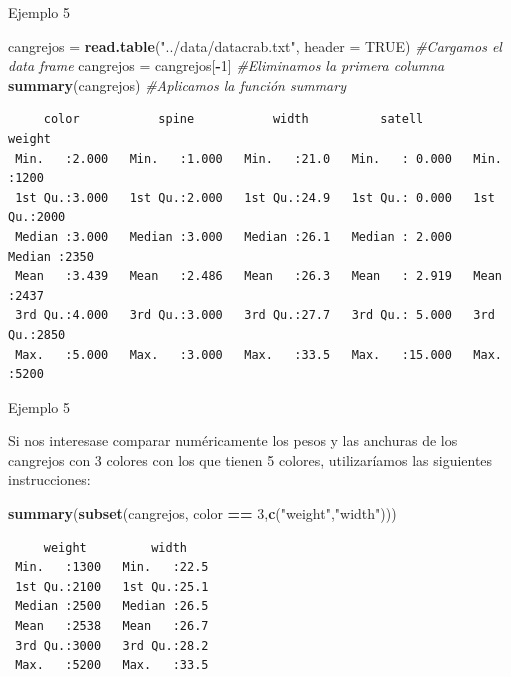 \documentclass[
  ignorenonframetext,
]{beamer}
\newenvironment{Shaded}{\begin{snugshade}}{\end{snugshade}}
\newcommand{\CommentTok}[1]{\textcolor[rgb]{0.56,0.35,0.01}{\textit{#1}}}
\newcommand{\DataTypeTok}[1]{\textcolor[rgb]{0.13,0.29,0.53}{#1}}
\newcommand{\DecValTok}[1]{\textcolor[rgb]{0.00,0.00,0.81}{#1}}
\newcommand{\KeywordTok}[1]{\textcolor[rgb]{0.13,0.29,0.53}{\textbf{#1}}}
\newcommand{\NormalTok}[1]{#1}
\newcommand{\OperatorTok}[1]{\textcolor[rgb]{0.81,0.36,0.00}{\textbf{#1}}}
\newcommand{\OtherTok}[1]{\textcolor[rgb]{0.56,0.35,0.01}{#1}}
\newcommand{\StringTok}[1]{\textcolor[rgb]{0.31,0.60,0.02}{#1}}
\begin{document}
\begin{frame}[fragile]{Ejemplo 5}
\protect\hypertarget{ejemplo-5}{}

\begin{Shaded}
\begin{Highlighting}[]
\NormalTok{cangrejos =}\StringTok{ }\KeywordTok{read.table}\NormalTok{(}\StringTok{"../data/datacrab.txt"}\NormalTok{, }\DataTypeTok{header =} \OtherTok{TRUE}\NormalTok{) }\CommentTok{#Cargamos el data frame}
\NormalTok{cangrejos =}\StringTok{ }\NormalTok{cangrejos[}\OperatorTok{-}\DecValTok{1}\NormalTok{] }\CommentTok{#Eliminamos la primera columna}
\KeywordTok{summary}\NormalTok{(cangrejos) }\CommentTok{#Aplicamos la función summary}
\end{Highlighting}
\end{Shaded}

\begin{verbatim}
     color           spine           width          satell           weight    
 Min.   :2.000   Min.   :1.000   Min.   :21.0   Min.   : 0.000   Min.   :1200  
 1st Qu.:3.000   1st Qu.:2.000   1st Qu.:24.9   1st Qu.: 0.000   1st Qu.:2000  
 Median :3.000   Median :3.000   Median :26.1   Median : 2.000   Median :2350  
 Mean   :3.439   Mean   :2.486   Mean   :26.3   Mean   : 2.919   Mean   :2437  
 3rd Qu.:4.000   3rd Qu.:3.000   3rd Qu.:27.7   3rd Qu.: 5.000   3rd Qu.:2850  
 Max.   :5.000   Max.   :3.000   Max.   :33.5   Max.   :15.000   Max.   :5200  
\end{verbatim}

\end{frame}

\begin{frame}[fragile]{Ejemplo 5}
\protect\hypertarget{ejemplo-5-1}{}

Si nos interesase comparar numéricamente los pesos y las anchuras de los
cangrejos con 3 colores con los que tienen 5 colores, utilizaríamos las
siguientes instrucciones:

\begin{Shaded}
\begin{Highlighting}[]
\KeywordTok{summary}\NormalTok{(}\KeywordTok{subset}\NormalTok{(cangrejos, color }\OperatorTok{==}\StringTok{ }\DecValTok{3}\NormalTok{,}\KeywordTok{c}\NormalTok{(}\StringTok{"weight"}\NormalTok{,}\StringTok{"width"}\NormalTok{)))}
\end{Highlighting}
\end{Shaded}

\begin{verbatim}
     weight         width     
 Min.   :1300   Min.   :22.5  
 1st Qu.:2100   1st Qu.:25.1  
 Median :2500   Median :26.5  
 Mean   :2538   Mean   :26.7  
 3rd Qu.:3000   3rd Qu.:28.2  
 Max.   :5200   Max.   :33.5  
\end{verbatim}

\end{frame}
\end{document}

